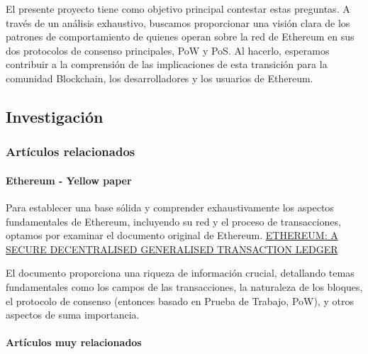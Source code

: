 \documentclass{article}
\begin{document}
El presente proyecto tiene como objetivo principal contestar estas preguntas. A través de un análisis exhaustivo, buscamos proporcionar una visión clara de los patrones de comportamiento de quienes operan sobre la red de Ethereum en sus dos protocolos de consenso principales, PoW y PoS. Al hacerlo, esperamos contribuir a la comprensión de las implicaciones de esta transición para la comunidad Blockchain, los desarrolladores y los usuarios de Ethereum.


\subsection{Investigación}

\subsubsection{Artículos relacionados}

\paragraph{Ethereum - Yellow paper } 
Para establecer una base sólida y comprender exhaustivamente los aspectos fundamentales de Ethereum, incluyendo su red y el proceso de transacciones, optamos por examinar el documento original de Ethereum. \newline
\href{https://ethereum.github.io/yellowpaper/paper.pdf}{ETHEREUM: A SECURE DECENTRALISED GENERALISED TRANSACTION LEDGER}

El documento proporciona una riqueza de información crucial, detallando temas fundamentales como los campos de las transacciones, la naturaleza de los bloques, el protocolo de consenso (entonces basado en Prueba de Trabajo, PoW), y otros aspectos de suma importancia.

\paragraph{Artículos muy relacionados}
\end{document}
